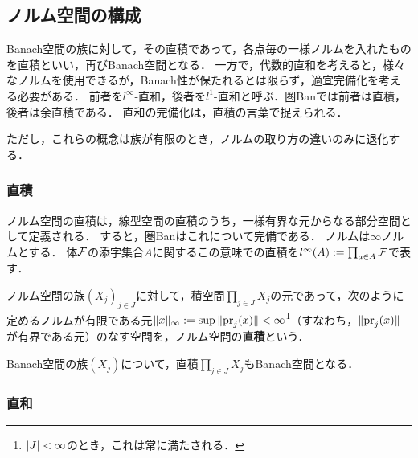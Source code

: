 \documentclass[uplatex,dvipdfmx]{jsreport}
\begin{document}
\subsection{ノルム空間の構成}

\begin{tcolorbox}[colframe=ForestGreen, colback=ForestGreen!10!white,breakable,colbacktitle=ForestGreen!40!white,coltitle=black,fonttitle=\bfseries\sffamily,
title=]
    Banach空間の族に対して，その直積であって，各点毎の一様ノルムを入れたものを直積といい，再びBanach空間となる．
    一方で，代数的直和を考えると，様々なノルムを使用できるが，Banach性が保たれるとは限らず，適宜完備化を考える必要がある．
    前者を$l^\infty$-直和，後者を$l^1$-直和と呼ぶ．圏Banでは前者は直積，後者は余直積である．
    直和の完備化は，直積の言葉で捉えられる．

    ただし，これらの概念は族が有限のとき，ノルムの取り方の違いのみに退化する．
\end{tcolorbox}

\subsubsection{直積}

\begin{tcolorbox}[colframe=ForestGreen, colback=ForestGreen!10!white,breakable,colbacktitle=ForestGreen!40!white,coltitle=black,fonttitle=\bfseries\sffamily,
title=]
    ノルム空間の直積は，線型空間の直積のうち，一様有界な元からなる部分空間として定義される．
    すると，圏Banはこれについて完備である．
    ノルムは$\infty$ノルムとする．
    体$\mathcal{F}$の添字集合$A$に関するこの意味での直積を$l^\infty(A):=\prod_{a\in A}\mathcal{F}$で表す．
\end{tcolorbox}

\begin{definition}
    ノルム空間の族$(X_j)_{j\in J}$に対して，積空間$\prod_{j\in J}X_j$の元であって，次のように定めるノルムが有限である元$\|x\|_\infty:=\sup\|\mathrm{pr}_j(x)\|<\infty$\footnote{$\lvert J\rvert<\infty$のとき，これは常に満たされる．}（すなわち，$\|\mathrm{pr}_j(x)\|$が有界である元）のなす空間を，ノルム空間の\textbf{直積}という．
\end{definition}

\begin{proposition}[Banach空間の直積に対する閉性]
    Banach空間の族$(X_j)$について，直積$\prod_{j\in J}X_j$もBanach空間となる．
\end{proposition}

\subsubsection{直和}
\end{document}
